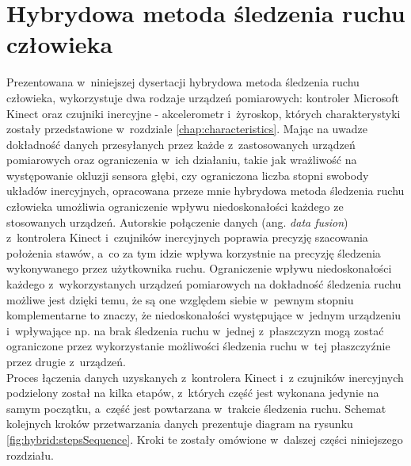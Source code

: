 \chapter{Hybrydowa metoda śledzenia ruchu człowieka}\label{chap:hybrid}

Prezentowana w~niniejszej dysertacji hybrydowa metoda śledzenia ruchu człowieka, wykorzystuje dwa rodzaje urządzeń pomiarowych: kontroler Microsoft Kinect oraz czujniki inercyjne - akcelerometr i~żyroskop, których charakterystyki zostały przedstawione w~rozdziale \ref{chap:characteristics}. Mając na uwadze dokładność danych przesyłanych przez każde z~zastosowanych urządzeń pomiarowych oraz ograniczenia w~ich działaniu, takie jak wrażliwość na występowanie okluzji sensora głębi, czy ograniczona liczba stopni swobody układów inercyjnych, opracowana przeze mnie hybrydowa metoda śledzenia ruchu człowieka umożliwia ograniczenie wpływu niedoskonałości każdego ze stosowanych urządzeń. Autorskie połączenie danych (ang. \textsl{data fusion}) z~kontrolera Kinect i~czujników inercyjnych poprawia precyzję szacowania położenia stawów, a~co za tym idzie wpływa korzystnie na precyzję śledzenia wykonywanego przez użytkownika ruchu. Ograniczenie wpływu niedoskonałości każdego z~wykorzystanych urządzeń pomiarowych na dokładność śledzenia ruchu możliwe jest dzięki temu, że są one względem siebie w~pewnym stopniu komplementarne to znaczy, że niedoskonałości występujące w~jednym urządzeniu i~wpływające np. na brak śledzenia ruchu w~jednej z~płaszczyzn mogą zostać ograniczone przez wykorzystanie możliwości śledzenia ruchu w~tej płaszczyźnie przez drugie z~urządzeń.\\
Proces łączenia danych uzyskanych z~kontrolera Kinect i~z czujników inercyjnych podzielony został na kilka etapów, z~których część jest wykonana jedynie na samym początku, a~część jest powtarzana w~trakcie śledzenia ruchu. Schemat kolejnych kroków przetwarzania danych prezentuje diagram na rysunku \ref{fig:hybrid:stepsSequence}. Kroki te zostały omówione w~dalszej części niniejszego rozdziału.\\


